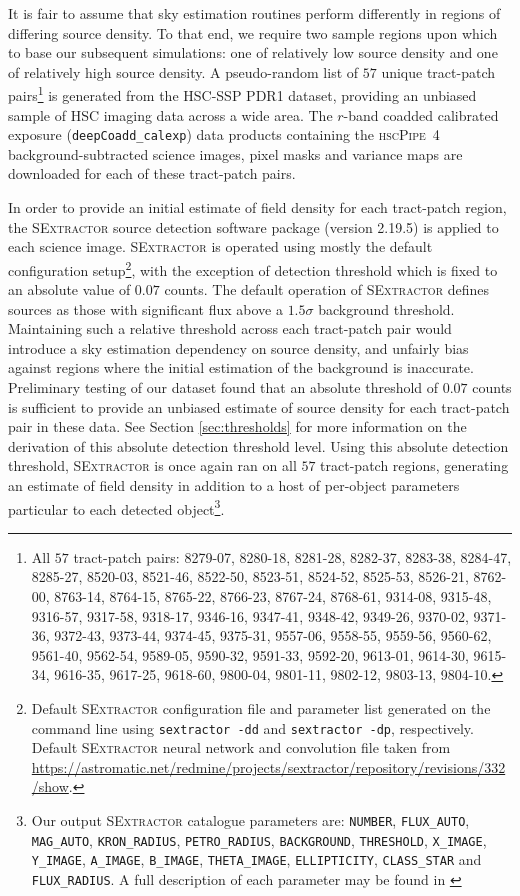 \documentclass[fleqn,usenatbib,useAMS]{mnras}
\newcommand*{\SExtractor}{\textsc{SExtractor}\xspace}
\begin{document}
It is fair to assume that sky estimation routines perform differently in regions of differing source density. To that end, we require two sample regions upon which to base our subsequent simulations: one of relatively low source density and one of relatively high source density. A pseudo-random list of $57$ unique tract-patch pairs\footnote{All $57$ tract-patch pairs: 8279-07, 8280-18, 8281-28, 8282-37, 8283-38, 8284-47, 8285-27, 8520-03, 8521-46, 8522-50, 8523-51, 8524-52, 8525-53, 8526-21, 8762-00, 8763-14, 8764-15, 8765-22, 8766-23, 8767-24, 8768-61, 9314-08, 9315-48, 9316-57, 9317-58, 9318-17, 9346-16, 9347-41, 9348-42, 9349-26, 9370-02, 9371-36, 9372-43, 9373-44, 9374-45, 9375-31, 9557-06, 9558-55, 9559-56, 9560-62, 9561-40, 9562-54, 9589-05, 9590-32, 9591-33, 9592-20, 9613-01, 9614-30, 9615-34, 9616-35, 9617-25, 9618-60, 9800-04, 9801-11, 9802-12, 9803-13, 9804-10.} is generated from the HSC-SSP PDR1 dataset, providing an unbiased sample of HSC imaging data across a wide area. The $r$-band coadded calibrated exposure (\texttt{deepCoadd\_calexp}) data products containing the \textsc{hscPipe~4} background-subtracted science images, pixel masks and variance maps are downloaded for each of these tract-patch pairs. 

In order to provide an initial estimate of field density for each tract-patch region, the \SExtractor \citep{Bertin1996} source detection software package (version 2.19.5) is applied to each science image. \SExtractor is operated using mostly the default configuration setup\footnote{Default \SExtractor configuration file and parameter list generated on the command line using \texttt{sextractor -dd} and \texttt{sextractor -dp}, respectively. Default \SExtractor neural network and convolution file taken from \url{https://astromatic.net/redmine/projects/sextractor/repository/revisions/332/show}.}, with the exception of detection threshold which is fixed to an absolute value of $0.07$ counts. The default operation of \SExtractor defines sources as those with significant flux above a $1.5\sigma$ background threshold. Maintaining such a relative threshold across each tract-patch pair would introduce a sky estimation dependency on source density, and unfairly bias against regions where the initial estimation of the background is inaccurate. Preliminary testing of our dataset found that an absolute threshold of $0.07$ counts is sufficient to provide an unbiased estimate of source density for each tract-patch pair in these data. See Section \ref{sec:thresholds} for more information on the derivation of this absolute detection threshold level. Using this absolute detection threshold, \SExtractor is once again ran on all $57$ tract-patch regions, generating an estimate of field density in addition to a host of per-object parameters particular to each detected object\footnote{Our output \SExtractor catalogue parameters are: \texttt{NUMBER}, \texttt{FLUX\_AUTO}, \texttt{MAG\_AUTO}, \texttt{KRON\_RADIUS}, \texttt{PETRO\_RADIUS}, \texttt{BACKGROUND}, \texttt{THRESHOLD}, \texttt{X\_IMAGE}, \texttt{Y\_IMAGE}, \texttt{A\_IMAGE}, \texttt{B\_IMAGE}, \texttt{THETA\_IMAGE}, \texttt{ELLIPTICITY}, \texttt{CLASS\_STAR} and \texttt{FLUX\_RADIUS}. A full description of each parameter may be found in \citet{Bertin1996}}.
\end{document}
